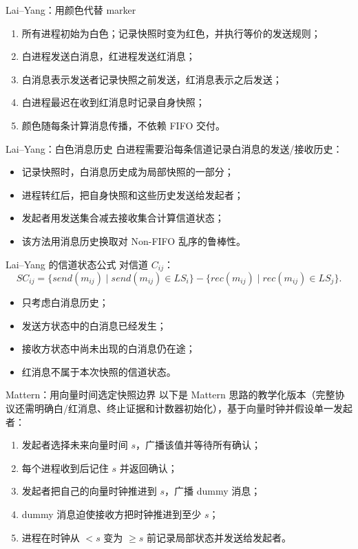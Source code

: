 \documentclass[UTF8,fontset=none,aspectratio=169,10pt]{beamer}
\begin{document}
\begin{frame}{Lai--Yang：用颜色代替 marker}
\begin{enumerate}
  \item 所有进程初始为白色；记录快照时变为红色，并执行等价的发送规则；
  \item 白进程发送白消息，红进程发送红消息；
  \item 白消息表示发送者记录快照之前发送，红消息表示之后发送；
  \item 白进程最迟在收到红消息时记录自身快照；
  \item 颜色随每条计算消息传播，不依赖 FIFO 交付。
\end{enumerate}
\end{frame}

\begin{frame}{Lai--Yang：白色消息历史}
白进程需要沿每条信道记录白消息的发送/接收历史：
\begin{itemize}
  \item 记录快照时，白消息历史成为局部快照的一部分；
  \item 进程转红后，把自身快照和这些历史发送给发起者；
  \item 发起者用发送集合减去接收集合计算信道状态；
  \item 该方法用消息历史换取对 Non-FIFO 乱序的鲁棒性。
\end{itemize}
\end{frame}

\begin{frame}{Lai--Yang 的信道状态公式}
对信道 $C_{ij}$：
\[
SC_{ij}
=\{send(m_{ij})\mid send(m_{ij})\in LS_i\}
-\{rec(m_{ij})\mid rec(m_{ij})\in LS_j\}.
\]
\begin{itemize}
  \item 只考虑白消息历史；
  \item 发送方状态中的白消息已经发生；
  \item 接收方状态中尚未出现的白消息仍在途；
  \item 红消息不属于本次快照的信道状态。
\end{itemize}
\end{frame}

\begin{frame}{Mattern：用向量时间选定快照边界}
以下是 Mattern 思路的教学化版本（完整协议还需明确白/红消息、终止证据和计数器初始化），基于向量时钟并假设单一发起者：
\begin{enumerate}
  \item 发起者选择未来向量时间 $s$，广播该值并等待所有确认；
  \item 每个进程收到后记住 $s$ 并返回确认；
  \item 发起者把自己的向量时钟推进到 $s$，广播 dummy 消息；
  \item dummy 消息迫使接收方把时钟推进到至少 $s$；
  \item 进程在时钟从 $<s$ 变为 $\ge s$ 前记录局部状态并发送给发起者。
\end{enumerate}
\end{frame}
\end{document}
